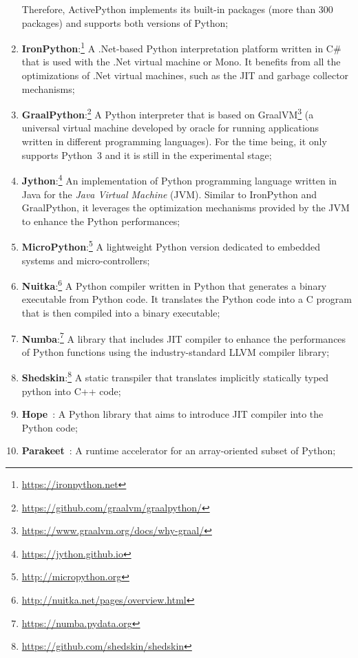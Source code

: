 \begin{enumerate}
          Therefore, ActivePython implements its built-in packages (more than 300 packages) and supports both versions of Python;
    \item \textbf{IronPython}:\footnote{\url{https://ironpython.net}}
          A .Net-based Python interpretation platform written in C\# that is used with the .Net virtual machine or Mono.
          It benefits from all the optimizations of .Net virtual machines, such as the JIT and garbage collector mechanisms;
    \item \textbf{GraalPython}:\footnote{\url{https://github.com/graalvm/graalpython/}}
          A Python interpreter that is based on GraalVM\footnote{\url{https://www.graalvm.org/docs/why-graal/}} (a universal virtual machine developed by oracle for running applications written in different programming languages).
          For the time being, it only supports Python~3 and it is still in the experimental stage;
    \item \textbf{Jython}:\footnote{\url{https://jython.github.io}}
          An implementation of Python programming language written in Java for the \emph{Java Virtual Machine} (JVM).
          Similar to IronPython and GraalPython, it leverages the optimization mechanisms provided by the JVM to enhance the Python performances;
    \item \textbf{MicroPython}:\footnote{\url{http://micropython.org}}
          A lightweight Python version dedicated to embedded systems and micro-controllers;
    \item \textbf{Nuitka}:\footnote{\url{http://nuitka.net/pages/overview.html}}
          A Python compiler written in Python that generates a binary executable from Python code.
          It translates the Python code into a C program that is then compiled into a binary executable;
    \item \textbf{Numba}:\footnote{\url{https://numba.pydata.org}}
          A library that includes JIT compiler to enhance the performances of Python functions using the industry-standard LLVM compiler library;
    \item \textbf{Shedskin}:\footnote{\url{https://github.com/shedskin/shedskin}}
          A static transpiler that translates implicitly statically typed python into C++ code;
    \item \textbf{Hope}~\cite{akeret_hope_2015}:
          A Python library that aims to introduce JIT compiler into the Python code;
    \item \textbf{Parakeet}~\cite{DBLP:conf/hotpar/RubinsteynHWS12}:
          A runtime accelerator for an array-oriented subset of Python;

\end{enumerate}

